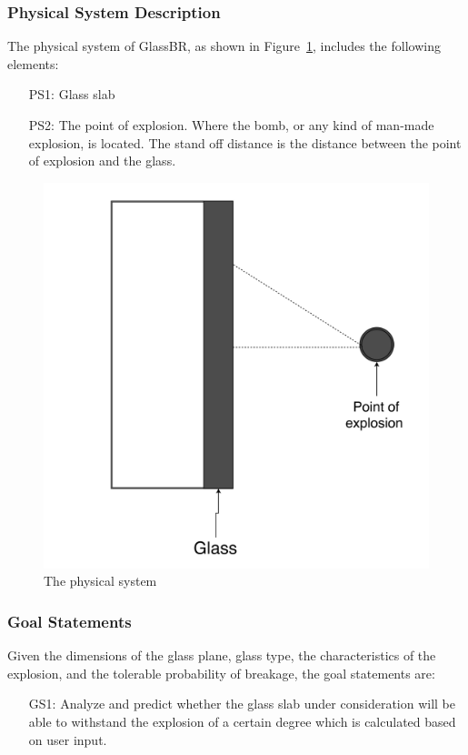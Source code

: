 \documentclass[12pt]{article}
\begin{document}
\subsubsection{Physical System Description}
\label{Sec:PhysSyst}
The physical system of GlassBR, as shown in Figure~\ref{Figure:physSystImage}, includes the following elements:
\begin{itemize}
\item[PS1:]Glass slab
\item[PS2:]The point of explosion. Where the bomb, or any kind of man-made explosion, is located. The stand off distance is the distance between the point of explosion and the glass.
\end{itemize}
\begin{figure}
\begin{center}
\includegraphics[width=\textwidth]{../../../datafiles/GlassBR/physicalsystimage.png}
\caption{The physical system}
\label{Figure:physSystImage}
\end{center}
\end{figure}
\subsubsection{Goal Statements}
\label{Sec:GoalStmt}
Given the dimensions of the glass plane, glass type, the characteristics of the explosion, and the tolerable probability of breakage, the goal statements are:
\begin{itemize}
\item[GS1:]Analyze and predict whether the glass slab under consideration will be able to withstand the explosion of a certain degree which is calculated based on user input.
\end{itemize}
\end{document}
